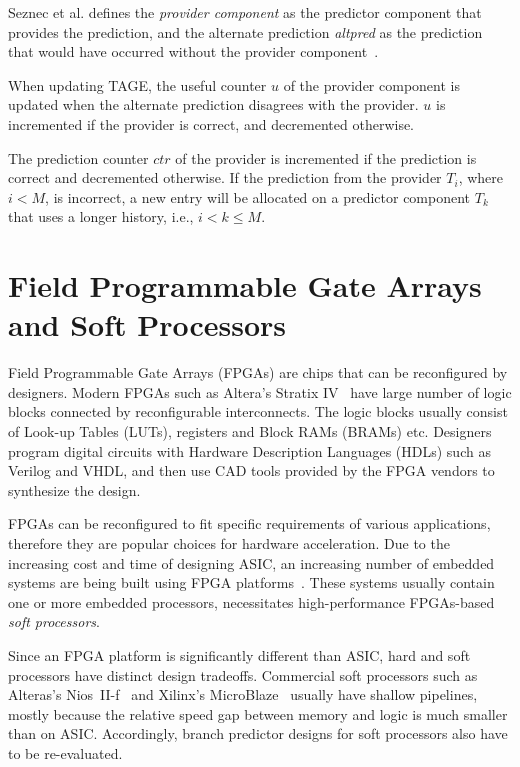 Seznec et al. defines the \textit{provider component} as the predictor component that provides the prediction, and the alternate prediction \textit{altpred} as the prediction that would have occurred without the provider component~\cite{tage}.

When updating TAGE, the useful counter $u$ of the provider component is updated when the alternate prediction disagrees with the provider. $u$ is incremented if the provider is correct, and decremented otherwise.

The prediction counter $ctr$ of the provider is incremented if the prediction is correct and decremented otherwise. If the prediction from the provider $T_i$, where $i < M$, is incorrect, a new entry will be allocated on a predictor component $T_k$ that uses a longer history, i.e., $i<k\leq M$.


\section{Field Programmable Gate Arrays and Soft Processors}
\label{sec:background:fpga}
Field Programmable Gate Arrays (FPGAs) are chips that can be reconfigured by designers. Modern FPGAs such as Altera's Stratix IV~\cite{StratixIV} have large number of logic blocks connected by reconfigurable interconnects. The logic blocks usually consist of Look-up Tables (LUTs), registers and Block RAMs (BRAMs) etc. Designers program digital circuits with Hardware Description Languages (HDLs) such as Verilog and VHDL, and then use CAD tools provided by the FPGA vendors to synthesize the design.

FPGAs can be reconfigured to fit specific requirements of various applications, therefore they are popular choices for hardware acceleration. Due to the increasing cost and time of designing ASIC, an increasing number of embedded systems are being built using FPGA platforms~\cite{softprocessor}. These systems usually contain one or more embedded processors, necessitates high-performance FPGAs-based \textit{soft processors}. 

Since an FPGA platform is significantly different than ASIC, hard and soft processors have distinct design tradeoffs. Commercial soft processors such as Alteras's Nios~II-f~\cite{niosiif} and Xilinx's MicroBlaze~\cite{microblaze} usually have shallow pipelines, mostly because the relative speed gap between memory and logic is much smaller than on ASIC. Accordingly, branch predictor designs for soft processors also have to be re-evaluated.



